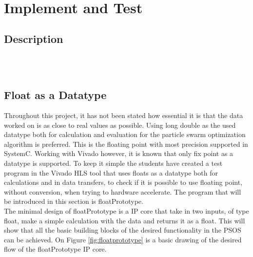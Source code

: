 \section{Implement and Test}

\subsection{Description}

\noindent{}
\\\\

\subsection{Float as a Datatype}\label{imp:floatprototype}
Throughout this project, it has not been stated how essential it is that the data worked on is as close to real values as possible. Using long double as the used datatype both for calculation and evaluation for the particle swarm optimization algorithm is preferred. This is the floating point with most precision supported in SystemC. Working with Vivado  however, it is known that only fix point as a datatype is supported. To keep it simple the students have created a test program in the Vivado HLS tool that uses floats as a datatype both for calculations and in data transfers, to check if it is possible to use floating point, without conversion, when trying to hardware accelerate. The program that will be introduced in this section is floatPrototype.\\

The minimal design of floatPrototype is a IP core that take in two inputs, of type float, make a simple calculation with the data and returns it as a float. This will show that all the basic building blocks of the desired functionality in the PSOS can be achieved. On Figure \ref{fig:floatprototype} is a basic drawing of the desired flow of the floatPrototype IP core.\\


